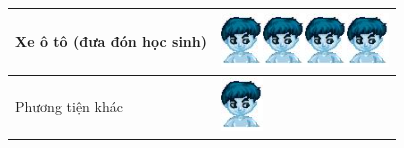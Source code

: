 \begin{vd}
\begin{center}
\begin{tabular}{|l|l|}
			\hline
			Xe ô tô (đưa đón học sinh)	&  \includegraphics[scale=0.4]{hs}\includegraphics[scale=0.4]{hs}\includegraphics[scale=0.4]{hs}\includegraphics[scale=0.4]{hs}    \\
			\hline
			Phương tiện khác &	\includegraphics[scale=0.4]{hs}\\
			\hline
		\end{tabular}
	

\end{center}
\end{vd}
